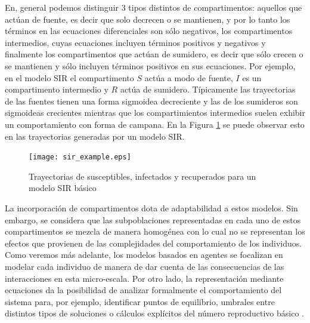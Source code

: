 En, general podemos distinguir 3 tipos distintos de compartimentos: aquellos que actúan de fuente, es decir que solo decrecen o se mantienen, y por lo tanto los términos en las ecuaciones diferenciales son sólo negativos, los compartimentos intermedios, cuyas ecuaciones incluyen términos positivos y negativos y finalmente los compartimentos que actúan de sumidero, es decir que sólo crecen o se mantienen y sólo incluyen términos positivos en sus ecuaciones. Por ejemplo, en el modelo SIR el compartimento $S$ actúa a modo de fuente, $I$ es un compartimento intermedio y $R$ actúa de sumidero. Típicamente las trayectorias de las fuentes tienen una forma sigmoidea decreciente y las de los sumideros son sigmoideas crecientes mientras que los compartimientos intermedios suelen exhibir un comportamiento con forma de campana. En la Figura \ref{fig:sir_example} se puede observar esto en las trayectorias generadas por un modelo SIR.

\begin{figure}[h]
    \centering
    \texttt{[image: sir\_example.eps]}
    \caption{Trayectorias de susceptibles, infectados y recuperados para un modelo SIR básico}
    \label{fig:sir_example}
\end{figure}

La incorporación de compartimentos dota de adaptabilidad a estos modelos. Sin embargo, se considera que las subpoblaciones representadas en cada uno de estos compartimentos se mezcla de manera homogénea con lo cual no se representan los efectos que provienen de las complejidades del comportamiento de los individuos. Como veremos más adelante, los modelos basados en agentes se focalizan en modelar cada individuo de manera de dar cuenta de las consecuencias de las interacciones en esta micro-escala. Por otro lado, la representación mediante ecuaciones da la posibilidad de analizar formalmente el comportamiento del sistema para, por ejemplo, identificar puntos de equilibrio, umbrales entre distintos tipos de soluciones o cálculos explícitos del número reproductivo básico \citep{Murray2007}.

